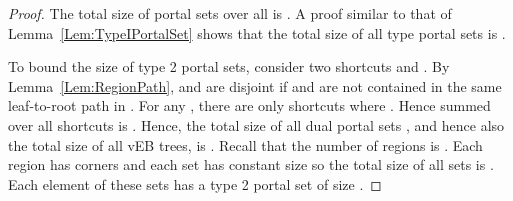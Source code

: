 \documentclass[11pt]{article}
\begin{document}
\begin{proof}
The total size of portal sets  over all  is . A proof similar to that of Lemma~\ref{Lem:TypeIPortalSet} shows that the total size of all type  portal sets is .

To bound the size of type 2 portal sets, consider two shortcuts  and . By Lemma~\ref{Lem:RegionPath},  and  are disjoint if  and  are not contained in the same leaf-to-root path  in . For any , there are only  shortcuts  where . Hence  summed over all shortcuts  is . Hence, the total size of all dual portal sets , and hence also the total size of all vEB trees, is . Recall that the number of regions is . Each region has  corners and each set  has constant size so the total size of all sets  is . Each element of these sets has a type 2 portal set of size .
\end{proof}
\end{document}
